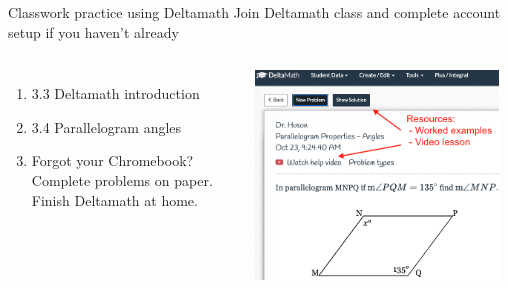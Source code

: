 \documentclass[onlytextwidth, aspectratio=169]{beamer}
\begin{document}
\begin{frame}{Classwork practice using Deltamath}
  {Join Deltamath class and complete account setup if you haven't already}
  \begin{columns}
    \begin{enumerate}
      \item 3.3 Deltamath introduction
      \item 3.4 Parallelogram angles
      \item Forgot your Chromebook? Complete problems on paper. Finish Deltamath at home.
    \end{enumerate}
      \includegraphics[width=0.95\textwidth]{../graphics/03-4deltamath-parallelograms.png}
  \end{columns}
\end{frame}
\end{document}
